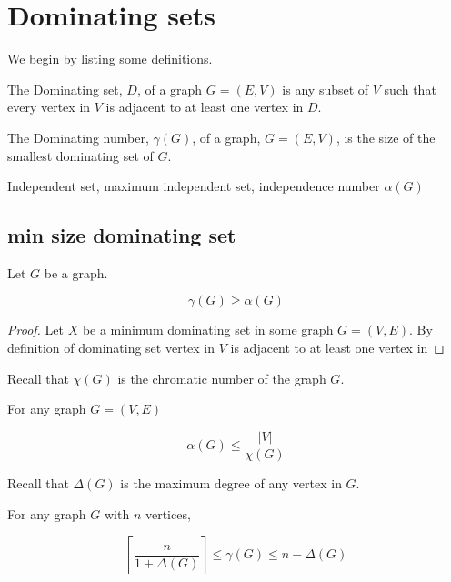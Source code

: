 \chapter{Dominating sets}

We begin by listing some definitions.

\begin{definition}
    The Dominating set, $D$, of a graph $G=(E,V)$ is any subset of $V$ such that every vertex in $V$ is adjacent to at least one vertex in $D$.
\end{definition}

\begin{definition}
    The Dominating number, $\gamma(G)$, of a graph, $G=(E,V)$, is the size of the smallest dominating set of $G$.
\end{definition}

\begin{definition}
    Independent set, maximum independent set, independence number $\alpha(G)$
\end{definition}

\section{min size dominating set}

\begin{lemma}
    Let $G$ be a graph. 
        
    \[\gamma(G) \geq \alpha(G)\]
\end{lemma}

\begin{proof}
    Let $X$ be a minimum dominating set in some graph $G=(V,E)$. By definition of dominating set vertex in $V$ is adjacent to at least one vertex in      
\end{proof}
    
Recall that $\chi(G)$ is the chromatic number of the graph $G$.

\begin{theorem}  \label{willis3.1}
    For any graph $G = (V,E)$ 

    \[\alpha(G) \leq \frac{ \left | {V} \right |}{\chi(G)}\]
\end{theorem}

Recall that $\Delta(G)$ is the maximum degree of any vertex in $G$.

\begin{theorem}  \label{balakrishnan10.3.2}
    For any graph $G$ with $n$ vertices, 
    
    \[ \left\lceil {\frac{n}{1+\Delta(G)}} \right\rceil \leq \gamma(G) \leq n - \Delta(G)\]    
\end{theorem}
    
